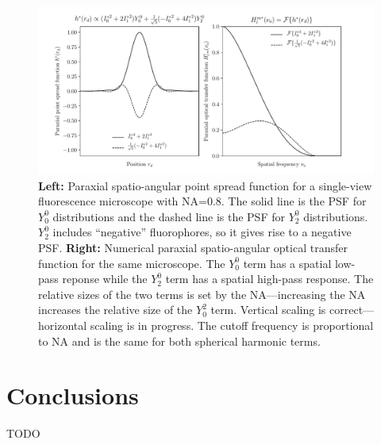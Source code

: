 \documentclass[11pt]{article}
\begin{document}
\begin{figure}[h]
 \captionsetup{width=1.0\linewidth}
 \centering
   \centering
   \includegraphics[width = 1.\textwidth]{../calculations/ft.pdf}
   \caption{\textbf{Left:} Paraxial spatio-angular point spread function for a
     single-view fluorescence microscope with NA=0.8. The solid line is the PSF
     for $Y_0^0$ distributions and the dashed line is the PSF for $Y_2^0$
     distributions. $Y_2^0$ includes ``negative'' fluorophores, so it gives rise
     to a negative PSF. \textbf{Right:} Numerical paraxial spatio-angular
     optical transfer function for the same microscope. The $Y_0^0$ term has a
     spatial low-pass reponse while the $Y_2^0$ term has a spatial high-pass
     response. The relative sizes of the two terms is set by the NA---increasing
     the NA increases the relative size of the $Y_0^2$ term. Vertical scaling is
     correct---horizontal scaling is in progress. The cutoff frequency is
     proportional to NA and is the same for both spherical harmonic terms.}
   \label{fig:frames_a}
\end{figure}
    


\section{Conclusions}

TODO 

{}

\end{document}
